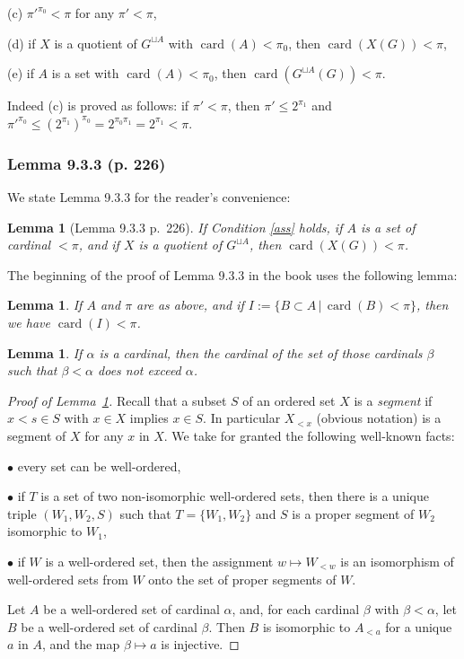 \documentclass[12pt]{article}%
\newtheorem{lem}[thm]{Lemma}
\theoremstyle{remark}
\theoremstyle{definition}
\newcommand{\bu}{\bullet}
\newcommand{\nn}{\noindent}
\DeclareMathOperator{\card}{card}%
\begin{document}
(c) $\pi'^{\pi_0}<\pi$ for any $\pi'<\pi$, 

(d) if $X$ is a quotient of $G^{\sqcup A}$ with $\card(A)<\pi_0$, then $\card(X(G))<\pi$, 

(e) if $A$ is a set with $\card(A)<\pi_0$, then $\card(G^{\sqcup A}(G))<\pi$.

\nn Indeed (c) is proved as follows: if $\pi'<\pi$, then $\pi'\le2^{\pi_1}$ and $\pi'^{\pi_0}\le(2^{\pi_1})^{\pi_0}=2^{\pi_0\pi_1}=2^{\pi_1}<\pi$.

\subsubsection{Lemma 9.3.3 (p. 226)}

We state Lemma 9.3.3 for the reader's convenience:

\begin{lem}[Lemma 9.3.3 p.~226]\label{933}
If Condition \ref{ass} holds, if $A$ is a set of cardinal $<\pi$, and if $X$ is a quotient of $G^{\sqcup A}$, then $\card(X(G))<\pi$.
\end{lem}

The beginning of the proof of Lemma 9.3.3 in the book uses the following lemma:

\begin{lem}\label{cardipi}
If $A$ and $\pi$ are as above, and if $I:=\{B\subset A\,|\,\card(B)<\pi\}$, then we have $\card(I)<\pi$. 
\end{lem}

\begin{lem}\label{ord}
If $\alpha$ is a cardinal, then the cardinal of the set of those cardinals $\beta$ such that $\beta<\alpha$ does not exceed $\alpha$.
\end{lem}

\begin{proof}[Proof of Lemma~\ref{ord}]
Recall that a subset $S$ of an ordered set $X$ is a {\em segment} if $x<s\in S$ with $x\in X$ implies $x\in S$. In particular $X_{<x}$ (obvious notation) is a segment of $X$ for any $x$ in $X$. We take for granted the following well-known facts:

\nn$\bu$ every set can be well-ordered,

\nn$\bu$ if $T$ is a set of two non-isomorphic well-ordered sets, then there is a unique triple $(W_1,W_2,S)$ such that $T=\{W_1,W_2\}$ and $S$ is a proper segment of $W_2$ isomorphic to $W_1$,

\nn$\bu$ if $W$ is a well-ordered set, then the assignment $w\mapsto W_{<w}$ is an isomorphism of well-ordered sets from $W$ onto the set of proper segments of $W$.

Let $A$ be a well-ordered set of cardinal $\alpha$, and, for each cardinal $\beta$ with $\beta<\alpha$, let $B$ be a well-ordered set of cardinal $\beta$. Then $B$ is isomorphic to $A_{<a}$ for a unique $a$ in $A$, and the map $\beta\mapsto a$ is injective.
\end{proof}
\end{document}
